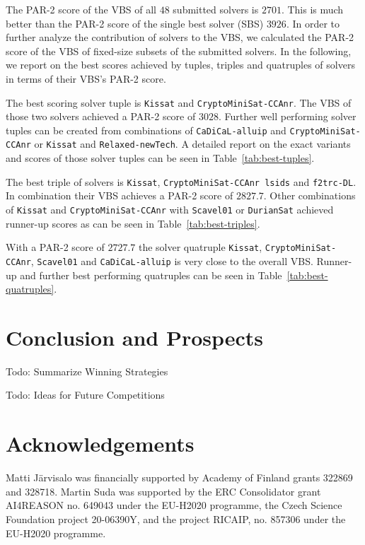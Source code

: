 \documentclass{elsarticle}
\newcommand{\todo}[1]{{\color{purple}Todo: #1}}
\newcommand{\solver}[1]{\texttt{#1}}
\begin{document}
The PAR-2 score of the VBS of all $48$ submitted solvers is $2701$. 
This is much better than the PAR-2 score of the single best solver (SBS) $3926$. 
In order to further analyze the contribution of solvers to the VBS, we calculated the PAR-2 score of the VBS of fixed-size subsets of the submitted solvers. 
In the following, we report on the best scores achieved by tuples, triples and quatruples of solvers in terms of their VBS's PAR-2 score. 

The best scoring solver tuple is \solver{Kissat} and \solver{CryptoMiniSat-CCAnr}. 
The VBS of those two solvers achieved a PAR-2 score of $3028$. 
Further well performing solver tuples can be created from combinations of \solver{CaDiCaL-alluip} and \solver{CryptoMiniSat-CCAnr} or \solver{Kissat} and \solver{Relaxed-newTech}. 
A detailed report on the exact variants and scores of those solver tuples can be seen in Table~\ref{tab:best-tuples}. 

The best triple of solvers is \solver{Kissat}, \solver{CryptoMiniSat-CCAnr lsids} and \solver{f2trc-DL}. 
In combination their VBS achieves a PAR-2 score of $2827.7$. 
Other combinations of \solver{Kissat} and \solver{CryptoMiniSat-CCAnr} with \solver{Scavel01} or \solver{DurianSat} achieved runner-up scores as can be seen in Table~\ref{tab:best-triples}. 

With a PAR-2 score of $2727.7$ the solver quatruple \solver{Kissat}, \solver{CryptoMiniSat-CCAnr}, \solver{Scavel01} and \solver{CaDiCaL-alluip} is very close to the overall VBS. 
Runner-up and further best performing quatruples can be seen in Table~\ref{tab:best-quatruples}. 


\section{Conclusion and Prospects}
\label{sec:conclusion}

\todo{Summarize Winning Strategies}

\todo{Ideas for Future Competitions}

\section*{Acknowledgements}
Matti J\"arvisalo was financially supported by Academy of Finland grants 322869 and 328718.
Martin Suda was supported by the ERC Consolidator grant AI4REASON no. 649043 under the EU-H2020 programme,
the Czech Science Foundation project 20-06390Y, and the project RICAIP, no. 857306 under the EU-H2020 programme.



\end{document}
